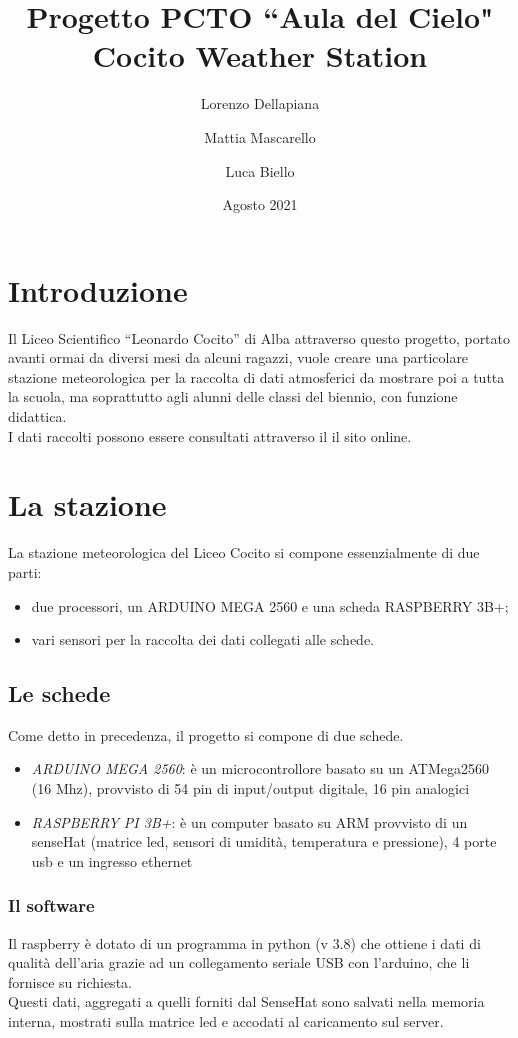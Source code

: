 \documentclass{article}
\title{%
  Progetto PCTO ``Aula del Cielo" \\
  \large Cocito Weather Station}
\author{Lorenzo Dellapiana\and Mattia Mascarello\and Luca Biello}
\date{Agosto 2021}
\def\blankpage{%
      \clearpage%
      \thispagestyle{empty}%
      \addtocounter{page}{-1}%
      \null%
      \clearpage}
\begin{document}
\maketitle
\pagebreak
\vspace*{\fill}
\tableofcontents
\vspace*{\fill}
\blankpage
\pagebreak
\section{Introduzione}
Il Liceo Scientifico “Leonardo Cocito” di Alba attraverso questo progetto, portato avanti ormai da diversi mesi da alcuni ragazzi, vuole creare una particolare stazione meteorologica per la raccolta di dati atmosferici da mostrare poi a tutta la scuola, ma soprattutto agli alunni delle classi del biennio, con funzione didattica.\\
I dati raccolti possono essere consultati attraverso il il sito online.
\section{La stazione}
La stazione meteorologica del Liceo Cocito si compone essenzialmente di due parti:
\begin{itemize}
\item due processori, un ARDUINO MEGA 2560 e una scheda RASPBERRY 3B+;\\
\item vari sensori per la raccolta dei dati collegati alle schede.
\end{itemize}
\subsection{Le schede}
Come detto in precedenza, il progetto si compone di due schede.
\begin{itemize}
\item \emph{ARDUINO MEGA 2560}: è un microcontrollore basato su un ATMega2560 (16 Mhz), provvisto di 54 pin di input/output digitale, 16 pin analogici\\ 
\item \emph{RASPBERRY PI 3B+}: è un computer basato su ARM provvisto di un senseHat (matrice led, sensori di umidità, temperatura e pressione), 4 porte usb e un ingresso ethernet
\end{itemize}
\subsubsection{Il software}
Il raspberry è dotato di un programma in python (v 3.8) che ottiene i dati di qualità dell'aria grazie ad un collegamento seriale USB con l'arduino, che li fornisce su richiesta.\\
Questi dati, aggregati a quelli forniti dal SenseHat sono salvati nella memoria interna, mostrati sulla matrice led e accodati al caricamento sul server.
\end{document}
